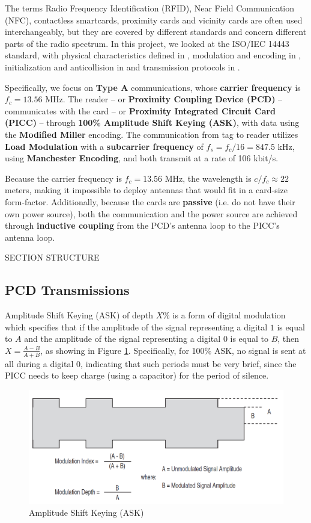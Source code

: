 \documentclass[fleqn,10pt]{SelfArx} %
\begin{document}
The terms Radio Frequency Identification (RFID), Near Field Communication (NFC), contactless smartcards, proximity cards and vicinity cards are often used interchangeably, but they are covered by different standards and concern different parts of the radio spectrum. In this project, we looked at the ISO/IEC 14443 standard, with physical characteristics defined in \cite{iso144431}, modulation and encoding in \cite{iso144432}, initialization and anticollision in \cite{iso144433} and transmission protocols in \cite{iso144434}.

Specifically, we focus on {\bf Type A} communications, whose {\bf carrier frequency} is $f_c=13.56$ MHz. The reader -- or {\bf Proximity Coupling Device (PCD)} -- communicates with the card -- or {\bf Proximity Integrated Circuit Card (PICC)} -- through {\bf 100\% Amplitude Shift Keying (ASK)}, with data using the {\bf Modified Miller} encoding. The communication from tag to reader utilizes {\bf Load Modulation} with a {\bf subcarrier frequency} of $f_s=f_c/16=847.5$ kHz, using {\bf Manchester Encoding}, and both transmit at a rate of 106 kbit/s. 

Because the carrier frequency is $f_c=13.56$ MHz, the wavelength is $c/f_c\approx22$ meters, making it impossible to deploy antennas that would fit in a card-size form-factor. Additionally, because the cards are {\bf passive} (i.e. do not have their own power source), both the communication and the power source are achieved through {\bf inductive coupling} from the PCD's antenna loop to the PICC's antenna loop.  

SECTION STRUCTURE

\subsection{PCD Transmissions}
\label{subsec:pcd}

Amplitude Shift Keying (ASK) of depth $X$\% is a form of digital modulation which specifies that if the amplitude of the signal representing a digital $1$ is equal to $A$ and the amplitude of the signal representing a digital $0$ is equal to $B$, then $X=\frac{A-B}{A+B}$, as showing in Figure \ref{fig:ask}. Specifically, for 100\% ASK, no signal is sent at all during a digital $0$, indicating that such periods must be very brief, since the PICC needs to keep charge (using a capacitor) for the period of silence.

\begin{figure}[h]
  \includegraphics[width=\linewidth]{img/ask.png}
  \caption{Amplitude Shift Keying (ASK) \cite{atmel}}
  \label{fig:ask}
\end{figure}
\end{document}
